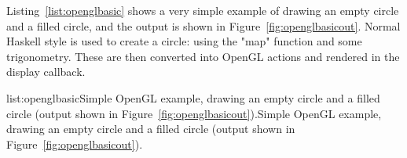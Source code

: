 Listing~\ref{list:openglbasic} shows a very simple example of drawing an empty circle and a filled circle, and the output is shown in Figure~\ref{fig:openglbasicout}. Normal Haskell style is used to create a circle: using the "map" function and some trigonometry. These are then converted into OpenGL actions and rendered in the display callback. 

\vspace{-0.5em}
\begin{listing}{list:openglbasic}{Simple OpenGL example, drawing an empty circle and a filled circle (output shown in Figure~\ref{fig:openglbasicout}).}{Simple OpenGL example, drawing an empty circle and a filled circle (output shown in Figure~\ref{fig:openglbasicout}).}{}
\end{listing}\vspace{-1.5em}

